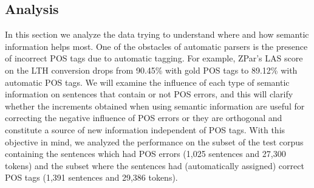 \documentclass[11pt]{article}
\begin{document}



\subsection{Analysis}\label{analysis}
In this section we analyze the data trying to understand where and how semantic information helps most.
One of the obstacles of automatic parsers is the presence of incorrect POS tags due to automatic 
tagging. For example, ZPar's LAS score on the LTH conversion drops from 90.45\% with gold POS tags 
to 89.12\% with automatic POS tags. We will examine the influence of each type of semantic information 
on sentences that contain or not POS errors, and this will clarify whether the increments obtained when 
using semantic information are useful for correcting the negative influence of POS errors or they are 
orthogonal and constitute a source of new information independent of POS tags.
With this objective in mind, we analyzed the performance on the subset of the test corpus containing 
the sentences which had POS errors (1,025 sentences and 27,300 tokens) and the subset where the 
sentences had (automatically assigned) correct POS tags (1,391 sentences and 29,386 tokens). %
\end{document}
